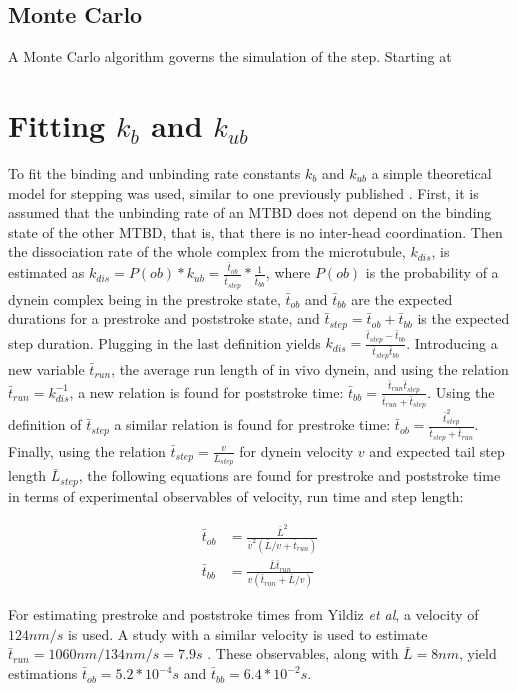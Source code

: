 \documentclass[9pt,twocolumn,twoside]{article}
\begin{document}
\subsection*{Monte Carlo}
A Monte Carlo algorithm governs the simulation of the step. Starting at 

\section*{Fitting $k_b$ and $k_{ub}$}
To fit the binding and unbinding rate constants $k_b$ and $k_{ub}$ a simple theoretical model for stepping was used, similar to one previously published \cite{myosindutyratio}. First, it is assumed that the unbinding rate of an MTBD does not depend on the binding state of the other MTBD, that is, that there is no inter-head coordination. Then the dissociation rate of the whole complex from the microtubule, $k_{dis}$, is estimated as $k_{dis} = P(ob)*k_{ub} = \frac{\bar{t}_{ob}}{\bar{t}_{step}} * \frac{1}{\bar{t}_{bb}}$, where $P(ob)$ is the probability of a dynein complex being in the prestroke state, $\bar{t}_{ob}$ and $\bar{t}_{bb}$ are the expected durations for a prestroke and poststroke state, and $\bar{t}_{step} = \bar{t}_{ob} + \bar{t}_{bb}$ is the expected step duration. Plugging in the last definition yields $k_{dis} = \frac{\bar{t}_{step} - \bar{t}_{bb}}{\bar{t}_{step}\bar{t}_{bb}}$. Introducing a new variable $\bar{t}_{run}$, the average run length of in vivo dynein, and using the relation $\bar{t}_{run} = k_{dis}^{-1}$, a new relation is found for poststroke time: $\bar{t}_{bb} = \frac{\bar{t}_{run}\bar{t}_{step}}{\bar{t}_{run}+\bar{t}_{step}}$. Using the definition of $\bar{t}_{step}$ a similar relation is found for prestroke time: $\bar{t}_{ob} = \frac{\bar{t}_{step}^2}{\bar{t}_{step}+\bar{t}_{run}}$. Finally, using the relation $\bar{t}_{step} = \frac{v}{L_{step}}$ for dynein velocity $v$ and expected tail step length $\bar{L}_{step}$, the following equations are found for prestroke and poststroke time in terms of experimental observables of velocity, run time and step length:

  \begin{align}
    \bar{t}_{ob} &= \frac{\bar{L}^2}{\bar{v}^2\left(\bar{L}/v+\bar{t}_{run}\right)}\\
    \bar{t}_{bb} &= \frac{\bar{L}\bar{t}_{run}}{v\left(\bar{t}_{run}+\bar{L}/v\right)}
  \end{align}

  For estimating prestroke and poststroke times from Yildiz \textit{et al}\cite{yildiz}, a velocity of $124 nm/s$ is used. A study with a similar velocity is used to estimate $\bar{t}_{run} = 1060 nm / 134 nm / s = 7.9s$ \cite{weihongpaper}. These observables, along with $\bar{L} = 8nm$, yield estimations $\bar{t}_{ob} = 5.2*10^{-4}s$ and $\bar{t}_{bb} = 6.4 * 10^{-2}s$.
\end{document}
